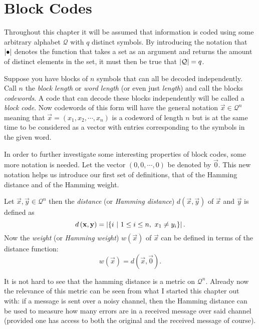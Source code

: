 \section{Block Codes}
\label{sec:blockcodes}
Throughout this chapter it will be assumed that information is coded using some arbitrary alphabet $\mathcal{Q}$ with $q$ distinct symbols. By introducing the notation that $\left\vert \bullet \right\vert$ denotes the function that takes a set as an argument and returns the amount of distinct elements in the set, it must then be true that $\left\vert \mathcal{Q} \right\vert = q$.

Suppose you have blocks of $n$ symbols that can all be decoded independently. Call $n$ the \emph{block length} or \emph{word length} (or even just \emph{length}) and call the blocks \emph{codewords}. A code that can decode these blocks independently will be called a \emph{block code}. Now codewords of this form will have the general notation $\vec{x} \in \mathcal{Q}^n$ meaning that $\vec{x} = \left(x_1, x_2, \cdots , x_n\right)$ is a codeword of length $n$ but is at the same time to be considered as a vector with entries corresponding to the symbols in the given word.

In order to further investigate some interesting properties of block codes, some more notation is needed. Let the vector $\left(0, 0, \cdots , 0\right)$ be denoted by $\vec{0}$. This new notation helps us introduce our first set of definitions, that of the Hamming distance and of the Hamming weight.
\begin{defi}
\label{def:hamdhamw}
	Let $\vec{x}, \vec{y} \in \mathcal{Q}^n$ then the \emph{distance} (or \emph{Hamming distance}) $d\left(\vec{x},\vec{y}\right)$ of $\vec{x}$ and $\vec{y}$ is defined as
	\[		
		d\left(\boldsymbol{\mathrm{x}},\boldsymbol{\mathrm{y}}\right) = \left\vert \left\{ i \ \middle\vert \ 1 \leq i \leq n, \ x_1 \neq y_i \right\} \right\vert.
	\]
	Now the \emph{weight} (or \emph{Hamming weight}) $w\left(\vec{x}\right)$ of $\vec{x}$ can be defined in terms of the distance function:
	\begin{equation*}
		w\left(\vec{x}\right) = d\left(\vec{x}, \vec{0}\right).
	\end{equation*}
\end{defi}

It is not hard to see that the hamming distance is a metric on $\mathcal{Q}^n$. Already now the relevance of this metric can be seen from what I started this chapter out with: if a message is sent over a noisy channel, then the Hamming distance can be used to measure how many errors are in a received message over said channel (provided one has access to both the original and the received message of course).


